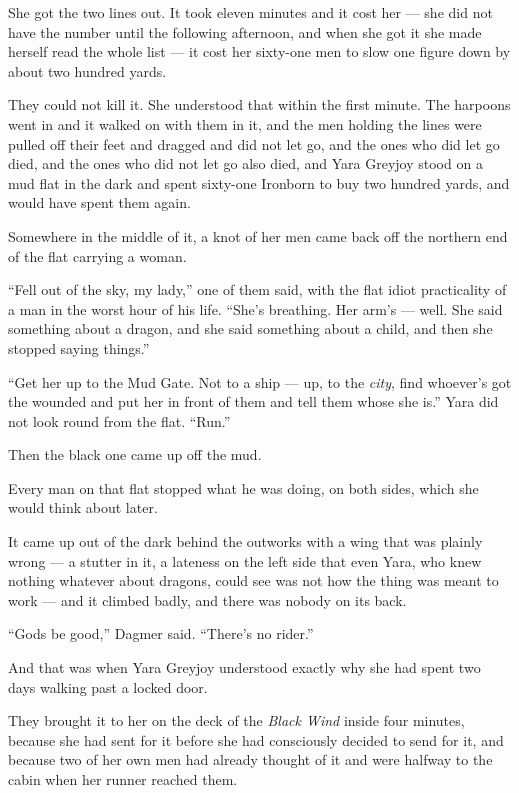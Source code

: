 She got the two lines out. It took eleven minutes and it cost her — she did not have the number until the following afternoon, and when she got it she made herself read the whole list — it cost her sixty-one men to slow one figure down by about two hundred yards.

They could not kill it. She understood that within the first minute. The harpoons went in and it walked on with them in it, and the men holding the lines were pulled off their feet and dragged and did not let go, and the ones who did let go died, and the ones who did not let go also died, and Yara Greyjoy stood on a mud flat in the dark and spent sixty-one Ironborn to buy two hundred yards, and would have spent them again.

Somewhere in the middle of it, a knot of her men came back off the northern end of the flat carrying a woman.

“Fell out of the sky, my lady,” one of them said, with the flat idiot practicality of a man in the worst hour of his life. “She’s breathing. Her arm’s — well. She said something about a dragon, and she said something about a child, and then she stopped saying things.”

“Get her up to the Mud Gate. Not to a ship — up, to the \textit{city}, find whoever’s got the wounded and put her in front of them and tell them whose she is.” Yara did not look round from the flat. “Run.”

\sceneBreak

Then the black one came up off the mud.

Every man on that flat stopped what he was doing, on both sides, which she would think about later.

It came up out of the dark behind the outworks with a wing that was plainly wrong — a stutter in it, a lateness on the left side that even Yara, who knew nothing whatever about dragons, could see was not how the thing was meant to work — and it climbed badly, and there was nobody on its back.

“Gods be good,” Dagmer said. “There’s no rider.”

And that was when Yara Greyjoy understood exactly why she had spent two days walking past a locked door.

\sceneBreak

They brought it to her on the deck of the \textit{Black Wind} inside four minutes, because she had sent for it before she had consciously decided to send for it, and because two of her own men had already thought of it and were halfway to the cabin when her runner reached them.

